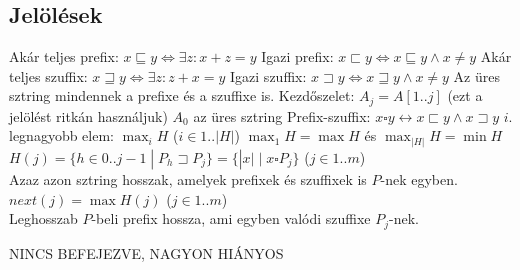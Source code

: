 \documentclass[12pt,a4paper]{article}
\begin{document}
\subsection{Jelölések}

\begin{outline}
	\1 Akár teljes prefix: $x \sqsubseteq y \Leftrightarrow \exists z: x + z = y$
	\1 Igazi prefix: $x \sqsubset y \Leftrightarrow x \sqsubseteq y \wedge x \ne y$
	\1 Akár teljes szuffix: $x \sqsupseteq y \Leftrightarrow \exists z: z + x = y$
	\1 Igazi szuffix: $x \sqsupset y \Leftrightarrow x \sqsupseteq y \wedge x \ne y$
	\1 Az üres sztring mindennek a prefixe és a szuffixe is.
	\1 Kezdőszelet: $A_j = A[1..j]$ (ezt a jelölést ritkán használjuk)
		\2 $A_0$ az üres sztring
	\1 Prefix-szuffix: $x \square y \leftrightarrow x \sqsubset y \wedge x \sqsupset y$
	\1 $i.$ legnagyobb elem: $\max_i H$ \;\; ($i \in 1..|H|$)
		\2 $\max_1 H = \max H$ és $\max_{|H|} H = \min H$
	\1 $H(j) = \{h \in 0..j-1 \;|\; P_h \sqsupset P_j\} = \{|x| \;|\; x \square P_j\}$
	\;\; ($j \in 1..m$) \\
	Azaz azon sztring hosszak, amelyek prefixek és szuffixek is $P$-nek egyben.
	\1 $next(j) = \max H(j)$ \;\; ($j \in 1..m$)\\
	Leghosszab $P$-beli prefix hossza, ami egyben valódi szuffixe $P_j$-nek.
\end{outline}

NINCS BEFEJEZVE, NAGYON HIÁNYOS
\end{document}
